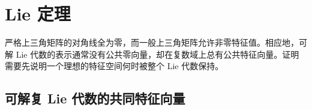 
\section{Lie 定理}
\label{b5:sec:1202}

%
%

严格上三角矩阵的对角线全为零，而一般上三角矩阵允许非零特征值。相应地，可解 Lie 代数的表示通常没有公共零向量，却在复数域上总有公共特征向量。证明需要先说明一个理想的特征空间何时被整个 Lie 代数保持。

\subsection{可解复 Lie 代数的共同特征向量}
\label{b5:subsec:1202:01}

